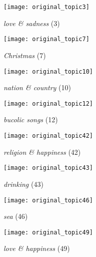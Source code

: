 \begin{figure}
	\begin{minipage}[c]{0.48\linewidth}
		\texttt{[image: original\_topic3]}
		\caption{\textit{love \& sadness} (3)}
		\label{fig:topic3Original}
		\vspace{4ex}
	\end{minipage}%
	\begin{minipage}[c]{0.48\linewidth}
		\texttt{[image: original\_topic7]}
		\caption{\textit{Christmas} (7)}
		\label{fig:topic7Original}
		\vspace{4ex}
	\end{minipage}%
	\hfill
	\begin{minipage}[c]{0.48\linewidth}
		\texttt{[image: original\_topic10]}
		\caption{\textit{nation \& country} (10)}
		\label{fig:topic10Original}
		\vspace{4ex}
	\end{minipage}%
	\begin{minipage}[c]{0.48\linewidth}
		\texttt{[image: original\_topic12]}
		\caption{\textit{bucolic songs} (12)}
		\label{fig:topic12Original}
		\vspace{4ex}
	\end{minipage}%
	\hfill
	\begin{minipage}[c]{0.48\linewidth}
		\texttt{[image: original\_topic42]}
		\caption{\textit{religion \& happiness} (42)}
		\label{fig:topic42Original}
		\vspace{4ex}
	\end{minipage}%
	\begin{minipage}[c]{0.48\linewidth}
		\texttt{[image: original\_topic43]}
		\caption{\textit{drinking} (43)}
		\label{fig:topic43Original}
		\vspace{4ex}
	\end{minipage}%
	\hfill
	\begin{minipage}[c]{0.48\linewidth}
		\texttt{[image: original\_topic46]}
		\caption{\textit{sea} (46)}
		\label{fig:topic46Original}
		\vspace{4ex}
	\end{minipage}%
	\begin{minipage}[c]{0.48\linewidth}
		\texttt{[image: original\_topic49]}
		\caption{\textit{love \& happiness} (49)}
		\label{fig:topic49Original}
		\vspace{4ex}
	\end{minipage}%
\end{figure}

